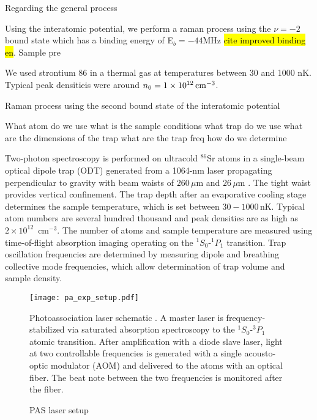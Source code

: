 Regarding the general process 

Using the \intPot{\gs}{\ex} interatomic potential, we perform a raman process using the $\nu=-2$ bound state which has a binding energy of E$_b=-44 \text{MHz}$ \hl{cite improved binding en}. Sample pre 

We used strontium 86 in a thermal gas at temperatures between 30 and 1000 nK. Typical peak densitieis were around $n_0 = 1 \times 10^{12} \, \text{cm}^{-3}$. 

Raman process using the second bound state of the \intPot{\gs}{\ex} interatomic potential

What atom do we use
what is the sample conditions
what trap do we use
what are the dimensions of the trap
what are the trap freq
how do we determine 

Two-photon spectroscopy is performed on ultracold $^{86}$Sr atoms in a single-beam optical dipole trap (ODT) generated from a 1064-nm laser propagating perpendicular to gravity with beam waists of $260$\,$\mu$m and $26$\,$\mu$m \cite{mmp08,ssk14}. The tight waist provides vertical confinement. The trap depth after an evaporative cooling stage determines the sample temperature, which is set between $30-1000$\,nK. Typical atom numbers are several hundred thousand and peak densities are as high as $2\times 10^{12}$\, cm$^{-3}$. The number of atoms and sample temperature are measured using time-of-flight absorption imaging operating on the $^1S_0$-$^1P_1$ transition. Trap oscillation frequencies are determined by measuring dipole and breathing collective mode frequencies, which allow determination of trap volume and sample density.




\begin{figure} \label{Experimental Setup}
\centerline{
  \texttt{[image: pa\_exp\_setup.pdf]}}
  \caption{PAS laser setup}{Photoassociation laser schematic . A master laser is frequency-stabilized via saturated absorption spectroscopy to the $^1S_0$-$^3P_1$ atomic transition. After amplification with a diode slave laser, light at two controllable frequencies is generated with a single acousto-optic modulator (AOM) and delivered to the atoms with an optical fiber. The beat note between the two frequencies is monitored after the fiber.}  
\end{figure}


